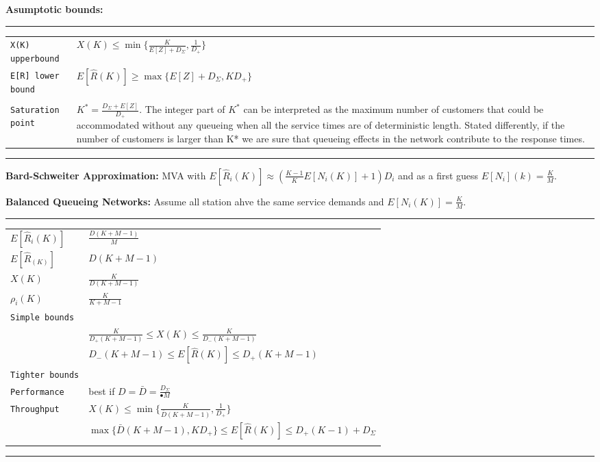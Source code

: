 \textbf{Asumptotic bounds:}
\hrule
{}
\begin{tabular}{@{}p{\the\MyLen}@{}p{\linewidth-\the\MyLen}@{}}
\verb!X(K) upperbound! 	&  $X(K) \leq \min\{\frac{K}{E[Z] + D_\Sigma}, \frac{1}{D_+}\}$\\
\verb!E[R] lower bound! 	&  $E[\hat{R}(K)] \geq \max\{E[Z] + D_\Sigma, KD_+\}$\\
\verb!! 	&  \\
\verb!Saturation point! 	&  $K^*  = \frac{D_\Sigma + E[Z]}{D_+}$. The integer part of $K^*$ can be interpreted as the maximum number of customers that could be accommodated without any queueing when all the service times are of deterministic length. Stated differently, if the number of customers is larger than K* we are sure that queueing effects in the network contribute to the response times.\\
\end{tabular}
\hrule

\textbf{Bard-Schweiter Approximation:}
MVA with $E[\hat{R}_i(K)] \approx (\frac{K-1}{K} E[N_i(K)] + 1) D_i$ and as a first guess $E[N_i](k) = \frac{K}{M}$.

\textbf{Balanced Queueing Networks:} Assume all station ahve the same service demands and $E[N_i(K)] = \frac{K}{M}$.
\hrule
{}
\begin{tabular}{@{}p{\the\MyLen}@{}p{\linewidth-\the\MyLen}@{}}
$E[\hat{R}_i(K)]$ 	&  $\frac{D(K+M-1)}{M}$\\
$E[\hat{R}_(K)]$ 	&  $D(K+M-1)$\\
$X(K)$ 	&  $\frac{K}{D(K+M-1)}$\\
$\rho_i(K)$ 	&  $\frac{K}{K+M-1}$\\
\verb!Simple bounds! 	&  \\
			& $\frac{K}{D_+(K+M-1)} \leq X(K) \leq \frac{K}{D_-(K+M-1)}$\\
			& $D_-(K+M-1) \leq E[\hat{R}(K)] \leq D_+(K+M-1)$\\
\verb!Tighter bounds! 	&  \\
\verb!Performance! 	&  best if $D = \bar{D} = \frac{D_\Sigma}{•M}$\\
\verb!Throughput! 	&  $X(K) \leq \min\{\frac{K}{\bar{D}(K+M-1)}, 
\frac{1}{D_+}\}$\\
&  $\max\{\bar{D}(K+M-1), KD_+\} \leq E[\hat{R}(K)] \leq D_+(K-1) + D_\Sigma$\\\\
\end{tabular}
\hrule